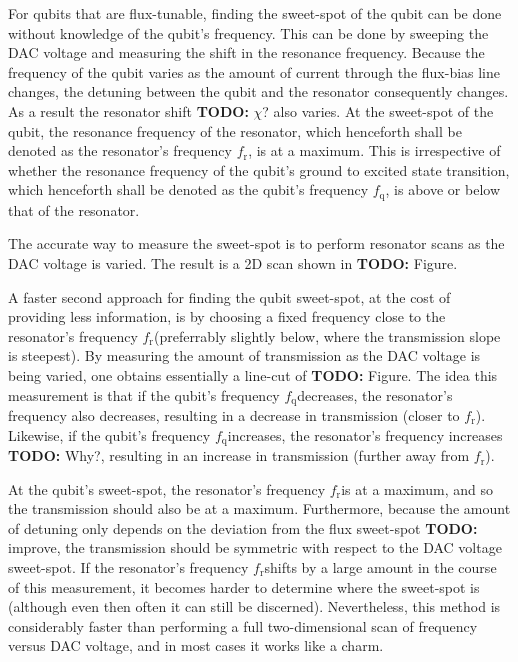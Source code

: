 \documentclass[12pt]{report}
\newcommand{\fres}{$f_\text{r}$}
\newcommand{\fqub}{$f_\text{q}$}
\begin{document}
        For qubits that are flux-tunable, finding the sweet-spot of the qubit can be done without knowledge of the qubit's frequency. This can be done by sweeping the DAC voltage and measuring the shift in the resonance frequency. Because the frequency of the qubit varies as the amount of current through the flux-bias line changes, the detuning between the qubit and the resonator consequently changes. As a result the resonator shift \textbf{TODO:} $\chi$? also varies. At the sweet-spot of the qubit, the resonance frequency of the resonator, which henceforth shall be denoted as the resonator's frequency \fres, is at a maximum. This is irrespective of whether the resonance frequency of the qubit's ground to excited state transition, which henceforth shall be denoted as the qubit's frequency \fqub, is above or below that of the resonator.

        The accurate way to measure the sweet-spot is to perform resonator scans as the DAC voltage is varied. The result is a 2D scan shown in \textbf{TODO:} Figure.

        A faster second approach for finding the qubit sweet-spot, at the cost of providing less information, is by choosing a fixed frequency close to the resonator's frequency \fres (preferrably slightly below, where the transmission slope is steepest). By measuring the amount of transmission as the DAC voltage is being varied, one obtains essentially a line-cut of \textbf{TODO:} Figure. The idea this measurement is that if the qubit's frequency \fqub decreases, the resonator's frequency also decreases, resulting in a decrease in transmission (closer to \fres). Likewise, if the qubit's frequency \fqub increases, the resonator's frequency increases \textbf{TODO:} Why?, resulting in an increase in transmission (further away from \fres).

        At the qubit's sweet-spot, the resonator's frequency \fres is at a maximum, and so the transmission should also be at a maximum. Furthermore, because the amount of detuning only depends on the deviation from the flux sweet-spot \textbf{TODO:} improve, the transmission should be symmetric with respect to the DAC voltage sweet-spot. If the resonator's frequency \fres shifts by a large amount in the course of this measurement, it becomes harder to determine where the sweet-spot is (although even then often it can still be discerned). Nevertheless, this method is considerably faster than performing a full two-dimensional scan of frequency versus DAC voltage, and in most cases it works like a charm.
\end{document}
